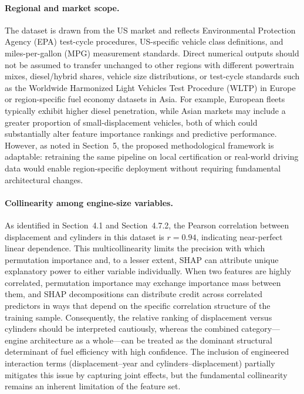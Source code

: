 \paragraph{Regional and market scope.}
The dataset is drawn from the US market and reflects Environmental Protection Agency (EPA) test-cycle procedures, US-specific vehicle class definitions, and miles-per-gallon (MPG) measurement standards. Direct numerical outputs should not be assumed to transfer unchanged to other regions with different powertrain mixes, diesel/hybrid shares, vehicle size distributions, or test-cycle standards such as the Worldwide Harmonized Light Vehicles Test Procedure (WLTP) in Europe or region-specific fuel economy datasets in Asia. For example, European fleets typically exhibit higher diesel penetration, while Asian markets may include a greater proportion of small-displacement vehicles, both of which could substantially alter feature importance rankings and predictive performance. However, as noted in Section~5, the proposed methodological framework is adaptable: retraining the same pipeline on local certification or real-world driving data would enable region-specific deployment without requiring fundamental architectural changes.

\paragraph{Collinearity among engine-size variables.}
As identified in Section~4.1 and Section~4.7.2, the Pearson correlation between displacement and cylinders in this dataset is \(r = 0.94\), indicating near-perfect linear dependence. This multicollinearity limits the precision with which permutation importance and, to a lesser extent, SHAP can attribute unique explanatory power to either variable individually. When two features are highly correlated, permutation importance may exchange importance mass between them, and SHAP decompositions can distribute credit across correlated predictors in ways that depend on the specific correlation structure of the training sample. Consequently, the relative ranking of displacement versus cylinders should be interpreted cautiously, whereas the combined category---engine architecture as a whole---can be treated as the dominant structural determinant of fuel efficiency with high confidence. The inclusion of engineered interaction terms (displacement--year and cylinders--displacement) partially mitigates this issue by capturing joint effects, but the fundamental collinearity remains an inherent limitation of the feature set.


